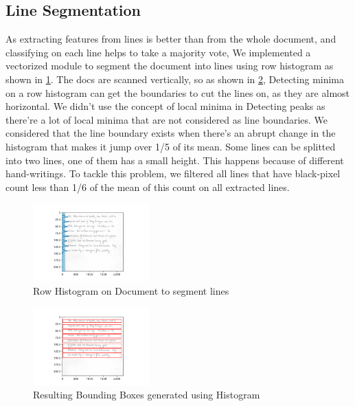 

\subsection{Line Segmentation}
As extracting features from lines is better than from the whole document, and classifying on each line helps to take a majority vote, We implemented a vectorized module to segment the document into lines using row histogram as shown in \ref{fig:histogram}. The docs are scanned vertically, so as shown in \ref{fig:bounding-boxes}, Detecting minima on a row histogram can get the boundaries to cut the lines on, as they are almost horizontal. We didn't use the concept of local minima in Detecting peaks as there're a lot of local minima that are not considered as line boundaries. We considered that the line boundary exists when there's an abrupt change in the histogram that makes it jump over 1/5 of its mean. Some lines can be splitted into two lines, one of them has a small height. This happens because of different hand-writings. To tackle this problem, we filtered all lines that have black-pixel count less than 1/6 of the mean of this count on all extracted lines. 

\begin{figure}[h!]
    \centering
    \includegraphics[width=0.4\textwidth]{images/histo.png}
    \caption{Row Histogram on Document to segment lines}
    \label{fig:histogram}
\end{figure}

\begin{figure}[h!]
    \centering
    \includegraphics[width=0.4\textwidth]{images/BB.png}
    \caption{Resulting Bounding Boxes generated using Histogram}
    \label{fig:bounding-boxes}
\end{figure}

